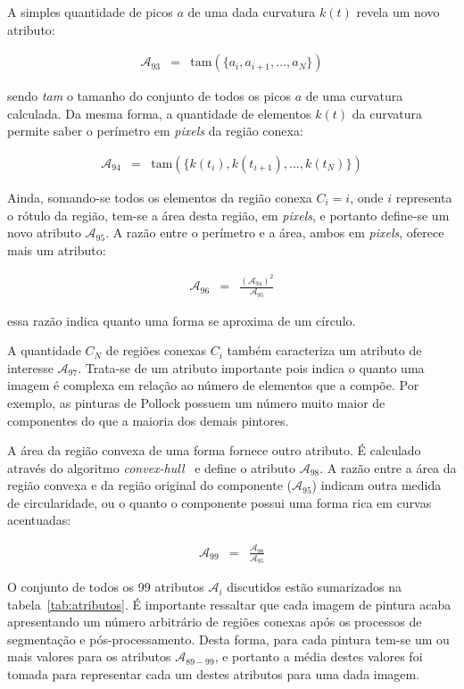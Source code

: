 A simples quantidade de picos $a$ de uma dada curvatura $k(t)$ revela um novo
atributo:

\begin{eqnarray}
  \mathcal{A}_{93} & = & \text{tam}(\{a_{i}, a_{i+1}, ..., a_{N}\})
\end{eqnarray}

\noindent sendo \textit{tam} o tamanho do conjunto de todos os picos $a$ de uma
curvatura calculada. Da mesma forma, a quantidade de elementos $k(t)$ da
curvatura permite saber o perímetro em \textit{pixels} da região conexa:

\begin{eqnarray}
  \mathcal{A}_{94} & = & \text{tam}(\{k(t_{i}), k(t_{i+1}), ..., k(t_{N})\})
\end{eqnarray}

Ainda, somando-se todos os elementos da região conexa $C_i = i$, onde $i$
representa o rótulo da região, tem-se a área desta região, em \textit{pixels}, e portanto
define-se um novo atributo $\mathcal{A}_{95}$. A razão entre o perímetro e a
área, ambos em \textit{pixels}, oferece mais um atributo:

\begin{eqnarray}
  \mathcal{A}_{96} & = & \frac{(\mathcal{A}_{94})^2}{\mathcal{A}_{95}}
\end{eqnarray}

\noindent essa razão indica quanto uma forma se aproxima de um círculo.

A quantidade $C_N$ de regiões conexas $C_i$ também caracteriza um atributo de
interesse $\mathcal{A}_{97}$. Trata-se de um atributo importante pois indica o
quanto uma imagem é complexa em relação ao número de elementos que a compõe. Por exemplo, as pinturas de Pollock possuem um número muito maior de componentes do
que a maioria dos demais pintores.

A área da região convexa de uma forma fornece outro atributo. É calculado
através do algoritmo \textit{convex-hull}~\cite{luciano} e define o atributo
$\mathcal{A}_{98}$. A razão entre a área da região convexa e da região original
do componente ($\mathcal{A}_{95}$) indicam outra medida de circularidade, ou o
quanto o componente possui uma forma rica em curvas acentuadas:

\begin{eqnarray}
  \mathcal{A}_{99} & = & \frac{\mathcal{A}_{98}}{\mathcal{A}_{95}}
\end{eqnarray}

O conjunto de todos os 99 atributos $\mathcal{A}_i$ discutidos estão sumarizados na
tabela~\ref{tab:atributos}. É importante ressaltar que cada imagem de pintura
acaba apresentando um número arbitrário de regiões conexas após os processos de
segmentação e pós-processamento. Desta forma, para cada pintura tem-se um ou
mais valores para os atributos $\mathcal{A}_{89-99}$, e portanto a média destes
valores foi tomada para representar cada um destes atributos para uma dada imagem.

